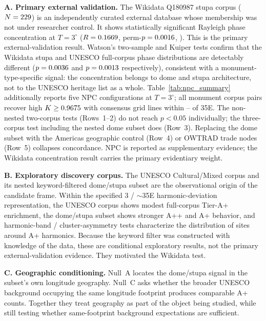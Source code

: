 \textbf{A. Primary external validation.}
The Wikidata Q180987 stupa corpus ($N = 229{}$) is an
independently curated external database whose membership was not
under researcher control. It shows statistically significant Rayleigh
phase concentration at $T=3^\circ$ ($R = 0.1669{}$,
perm-$p = 0.0016{}$, \circConcStupaPSig{}). This is the
primary external-validation result. Watson's two-sample and Kuiper
tests confirm that the Wikidata stupa and UNESCO full-corpus phase
distributions are detectably different ($p=0.0036{}$
and $p=0.0013{}$ respectively), consistent with a
monument-type-specific signal: the concentration belongs to dome and
stupa architecture, not to the UNESCO heritage list as a whole.
Table~\ref{tab:npc_summary} additionally reports five NPC
configurations at $T=3^\circ$; all monument corpus pairs recover high
$K \geq 0.9675{}$ with consensus grid lines within
\npcDomeStupaGridDeltaE\textdegree{}--\npcTwoGridDeltaE\textdegree{}
of 35\textdegree{}E. The non-nested two-corpus tests (Rows~1--2) do
not reach $p<0.05$ individually; the three-corpus test including the
nested dome subset does (Row~3). Replacing the dome subset with the
Americas geographic control (Row~4) or OWTRAD trade nodes (Row~5)
collapses concordance. NPC is reported as supplementary evidence; the
Wikidata concentration result carries the primary evidentiary weight.

\textbf{B. Exploratory discovery corpus.}
The UNESCO Cultural/Mixed corpus and its nested keyword-filtered
dome/stupa subset are the observational origin of the candidate
frame. Within the specified 3\textdegree{} / $\sim$35\textdegree{}E
harmonic-deviation representation, the UNESCO corpus shows modest
full-corpus Tier-A+ enrichment, the dome/stupa subset shows stronger
A++ and A+ behavior, and harmonic-band / cluster-asymmetry tests
characterize the distribution of sites around A+ harmonics.
Because the keyword filter was constructed with knowledge of the data,
these are conditional exploratory results, not the primary
external-validation evidence. They motivated the Wikidata test.

\textbf{C. Geographic conditioning.}
Null~A locates the dome/stupa signal in the subset's own longitude
geography. Null~C asks whether the broader UNESCO background occupying
the same longitude footprint produces comparable A+ counts. Together
they treat geography as part of the object being studied, while still
testing whether same-footprint background expectations are sufficient.

